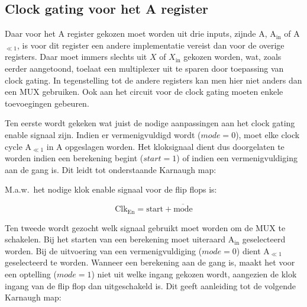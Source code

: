 \subsection{Clock gating voor het A register}


Daar voor het A register gekozen moet worden uit drie  inputs, zijnde A, A$_{\text{in}}$ of A$_{\ll 1}$, is voor dit register een andere implementatie vereist dan voor de overige registers. Daar moet immers slechts uit $X$ of $X_{\text{in}}$ gekozen worden, wat, zoals eerder aangetoond, toelaat een multiplexer uit te sparen door toepassing van clock gating. In tegenstelling tot de andere registers kan men hier niet anders dan een MUX gebruiken. Ook aan het circuit voor de clock gating moeten enkele toevoegingen gebeuren.

Ten eerste wordt gekeken wat juist de nodige aanpassingen aan het clock gating enable signaal zijn. Indien er vermenigvuldigd wordt ($mode = 0$), moet elke clock cycle A$_{\ll 1}$ in A opgeslagen worden. Het kloksignaal dient dus doorgelaten te worden indien een berekening begint ($start = 1$) of indien een vermenigvuldiging aan de gang is. Dit leidt tot onderstaande Karnaugh map:

\vspace{\textfloatsep}
\begin{minipage}{\linewidth}
	\begin{center}
	\end{center}
\end{minipage}
\vspace{\textfloatsep}

M.a.w.\ het nodige klok enable signaal voor de flip flops is:

\[ \text{Clk}_{\text{En}} = \text{start} + \overline{\text{mode}} \]

Ten tweede wordt gezocht welk signaal gebruikt moet worden om de MUX te schakelen. Bij het starten van een berekening moet uiteraard A$_{\text{in}}$ geselecteerd worden. Bij de uitvoering van een vermenigvuldiging ($mode = 0$) dient A$_{\ll 1}$ geselecteerd te worden. Wanneer een berekening aan de gang is, maakt het voor een optelling ($mode = 1$) niet uit welke ingang gekozen wordt, aangezien de klok ingang van de flip flop dan uitgeschakeld is. Dit geeft aanleiding tot de volgende Karnaugh map:

